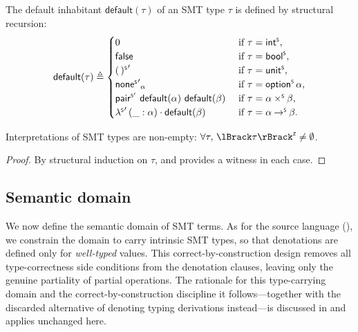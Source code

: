 \begin{definition}
  \label{def:smt-default}
  The default inhabitant \(\mathsf{default}(\tau)\) of an SMT type \(\tau\) is defined by
  structural recursion:
  \[
    \mathsf{default}(\tau) \triangleq
    \begin{cases}
      0 &\text{ if } \tau = \mathsf{int}^{\scriptscriptstyle{\mathsf{S}}},\\
      \mathsf{false} &\text{ if } \tau = \mathsf{bool}^{\scriptscriptstyle{\mathsf{S}}},\\
      \mathord{{\mathord{(\,)^{\scriptscriptstyle{\mathsf{S}}}}}^{\prime}} &\text{ if } \tau = \mathsf{unit}^{\scriptscriptstyle{\mathsf{S}}}, \\
      \mathord{{\mathord{\mathsf{none}^{\scriptscriptstyle{\mathsf{S}}}}}^{\prime}}_{\alpha} &\text{ if } \tau = \mathord{\mathsf{option}^{\scriptscriptstyle{\mathsf{S}}}}\,\alpha,\\
      \mathord{\mathsf{pair}^{\scriptscriptstyle{\mathsf{S'}}}}\ \mathsf{default}(\alpha)\ \mathsf{default}(\beta) &\text{ if } \tau = \alpha \mathbin{\times^{\scriptscriptstyle{\mathsf{S}}}} \beta,\\
      \mathord{{\lambda^{\scriptscriptstyle{\mathsf{S}}}}^{\prime}}\, (\_ : \alpha) \cdot \mathsf{default}(\beta) &\text{ if } \tau = \alpha \mathbin{\to^{\scriptscriptstyle{\mathsf{S}}}} \beta.
    \end{cases}
  \]
\end{definition}

\begin{lemma}
  \label{thm:smt-type-nonempty}
  Interpretations of SMT types are non-empty: \(\forall \tau,\, \interpZ{\tau} \neq \emptyset\).
\end{lemma}
\begin{proof}
  By structural induction on \(\tau\), and  provides a witness in each case.
\end{proof}

\subsection{Semantic domain}
\label{subsec:smt-sem-domain}

We now define the semantic domain of SMT terms. As for the source language
(), we constrain the domain to carry intrinsic SMT types,
so that denotations are defined only for \emph{well-typed} values. This
correct-by-construction design removes all type-correctness side conditions from
the denotation clauses, leaving only the genuine partiality of partial
operations. The rationale for this type-carrying domain and the correct-by-construction
discipline it follows---together with the discarded alternative of denoting typing
derivations instead---is discussed in  and applies
unchanged here.

